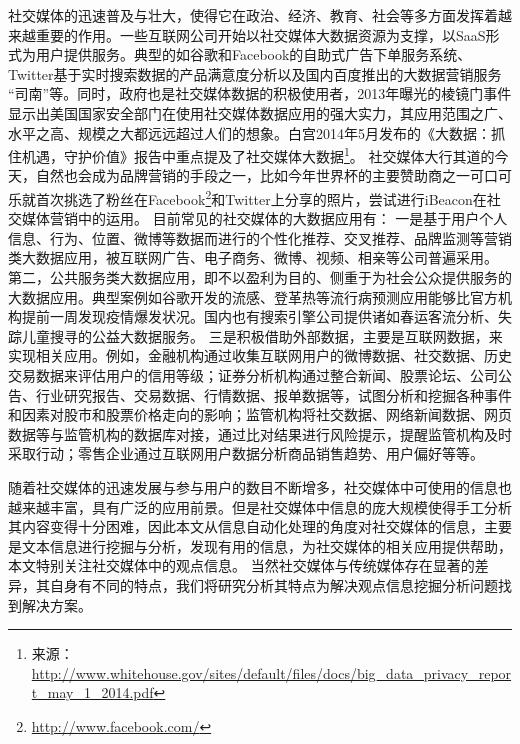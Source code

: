 社交媒体的迅速普及与壮大，使得它在政治、经济、教育、社会等多方面发挥着越来越重要的作用。一些互联网公司开始以社交媒体大数据资源为支撑，以SaaS形式为用户提供服务。典型的如谷歌和Facebook的自助式广告下单服务系统、Twitter基于实时搜索数据的产品满意度分析以及国内百度推出的大数据营销服务 “司南”等。同时，政府也是社交媒体数据的积极使用者，2013年曝光的棱镜门事件显示出美国国家安全部门在使用社交媒体数据应用的强大实力，其应用范围之广、水平之高、规模之大都远远超过人们的想象。白宫2014年5月发布的《大数据：抓住机遇，守护价值》报告中重点提及了社交媒体大数据\footnote{来源：\url{http://www.whitehouse.gov/sites/default/files/docs/big\_data\_privacy\_report\_may\_1\_2014.pdf}}。
社交媒体大行其道的今天，自然也会成为品牌营销的手段之一，比如今年世界杯的主要赞助商之一可口可乐就首次挑选了粉丝在Facebook\footnote{\url{http://www.facebook.com/}}和Twitter上分享的照片，尝试进行iBeacon在社交媒体营销中的运用。
目前常见的社交媒体的大数据应用有：
一是基于用户个人信息、行为、位置、微博等数据而进行的个性化推荐、交叉推荐、品牌监测等营销类大数据应用，被互联网广告、电子商务、微博、视频、相亲等公司普遍采用。
第二，公共服务类大数据应用，即不以盈利为目的、侧重于为社会公众提供服务的大数据应用。典型案例如谷歌开发的流感、登革热等流行病预测应用能够比官方机构提前一周发现疫情爆发状况。国内也有搜索引擎公司提供诸如春运客流分析、失踪儿童搜寻的公益大数据服务。
三是积极借助外部数据，主要是互联网数据，来实现相关应用。例如，金融机构通过收集互联网用户的微博数据、社交数据、历史交易数据来评估用户的信用等级；证券分析机构通过整合新闻、股票论坛、公司公告、行业研究报告、交易数据、行情数据、报单数据等，试图分析和挖掘各种事件和因素对股市和股票价格走向的影响；监管机构将社交数据、网络新闻数据、网页数据等与监管机构的数据库对接，通过比对结果进行风险提示，提醒监管机构及时采取行动；零售企业通过互联网用户数据分析商品销售趋势、用户偏好等等。

随着社交媒体的迅速发展与参与用户的数目不断增多，社交媒体中可使用的信息也越来越丰富，具有广泛的应用前景。但是社交媒体中信息的庞大规模使得手工分析其内容变得十分困难，因此本文从信息自动化处理的角度对社交媒体的信息，主要是文本信息进行挖掘与分析，发现有用的信息，为社交媒体的相关应用提供帮助，本文特别关注社交媒体中的观点信息。
当然社交媒体与传统媒体存在显著的差异，其自身有不同的特点，我们将研究分析其特点为解决观点信息挖掘分析问题找到解决方案。


